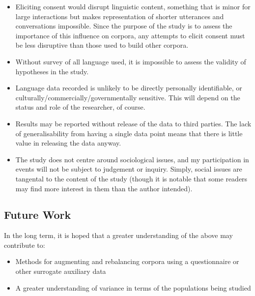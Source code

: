 \begin{itemize}
    \item Eliciting consent would disrupt linguistic content, something that is minor for large interactions but makes representation of shorter utterances and conversations impossible. Since the purpose of the study is to assess the importance of this influence on corpora, any attempts to elicit consent must be less disruptive than those used to build other corpora.
    \item Without survey of all language used, it is impossible to assess the validity of hypotheses in the study.
    \item Language data recorded is unlikely to be directly personally identifiable, or culturally/commercially/governmentally sensitive. This will depend on the status and role of the researcher, of course.
    \item Results may be reported without release of the data to third parties. The lack of generalisability from having a single data point means that there is little value in releasing the data anyway.
    \item The study does not centre around sociological issues, and my participation in events will not be subject to judgement or inquiry. Simply, social issues are tangental to the content of the study (though it is notable that some readers may find more interest in them than the author intended).
\end{itemize}









\subsection{Future Work}

In the long term, it is hoped that a greater understanding of the above may contribute to:

\begin{itemize}
    \item Methods for augmenting and rebalancing corpora using a questionnaire or other surrogate auxiliary data
    \item A greater understanding of variance in terms of the populations being studied
\end{itemize}

